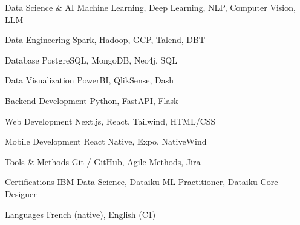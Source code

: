 


\begin{cvskills}


\cvskill
{Data Science \& AI} %
{Machine Learning, Deep Learning, NLP, Computer Vision, LLM} %


\cvskill
{Data Engineering} %
{Spark, Hadoop, GCP, Talend, DBT} %


\cvskill
{Database} %
{PostgreSQL, MongoDB, Neo4j, SQL} %


\cvskill
{Data Visualization} %
{PowerBI, QlikSense, Dash} %


\cvskill
{Backend Development} %
{Python, FastAPI, Flask} %


\cvskill
{Web Development} %
{Next.js, React, Tailwind, HTML/CSS} %


\cvskill
{Mobile Development} %
{React Native, Expo, NativeWind} %


\cvskill
{Tools \& Methods} %
{Git / GitHub, Agile Methods, Jira} %


\cvskill
{Certifications} %
{IBM Data Science, Dataiku ML Practitioner, Dataiku Core Designer} %


\cvskill
{Languages} %
{French (native), English (C1)} %


\end{cvskills}

